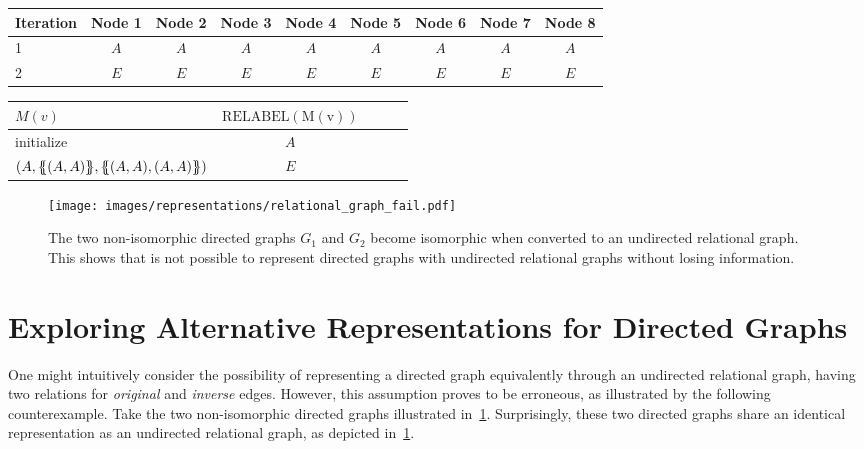 \documentclass{article}
\newcommand*{\ldblbrace}{\{\mskip-6mu\{}
\newcommand*{\rdblbrace}{\}\mskip-6mu\}}
\theoremstyle{plain}
\theoremstyle{definition}
\theoremstyle{remark}
\begin{document}
\begin{table*}[t]
\begin{center}
\begin{small}
\begin{sc}
\begin{tabular}{l||cccc|cccc}
\toprule
Iteration     & Node 1  & Node 2 & Node 3 & Node 4 & Node 5  & Node 6 & Node 7 & Node 8 \\
\midrule
1             &  $A$      &  $A$     &  $A$     &  $A$     &  $A$      &  $A$     &  $A$     &  $A$     \\
2             &  $E$      &  $E$     &  $E$     &  $E$     &  $E$      &  $E$     &  $E$     &  $E$     \\
\bottomrule
\end{tabular}

\begin{tabular}{lcccr}
\toprule
$M(v)$                                                      & $\mathrm{RELABEL(M(v))}$   \\
\midrule
initialize                                                  &   $A$                        \\
$(A, \ldblbrace (A, A) \rdblbrace, \ldblbrace (A, A), (A, A) \rdblbrace)$             &   $E$                        \\
\bottomrule
\end{tabular}

\end{sc}
\end{small}
\end{center}
\caption{Node colorings at different iterations, as well as the $\mathrm{RELABEL}$ hash function, when applying U-WL to the two graphs in~\cref{fig:mpnn-u_fails}.}
\label{tab:wl-u}
\end{table*}




  
\begin{figure}
    \centering
    \texttt{[image: images/representations/relational\_graph\_fail.pdf]}
    \caption{The two non-isomorphic directed graphs $G_1$ and $G_2$ become isomorphic when converted to an undirected relational graph. This shows that is not possible to represent directed graphs with undirected relational graphs without losing information.}
    \label{fig:relational_graph_fail}
\end{figure}

\section{Exploring Alternative Representations for Directed Graphs} \label{sec:alternative_representations}
One might intuitively consider the possibility of representing a directed graph equivalently through an undirected relational graph, having two relations for \textit{original} and \textit{inverse} edges. However, this assumption proves to be erroneous, as illustrated by the following counterexample. Take the two non-isomorphic directed graphs illustrated in~\cref{fig:relational_graph_fail}. Surprisingly, these two directed graphs share an identical representation as an undirected relational graph, as depicted in~\cref{fig:relational_graph_fail}. 
\end{document}
